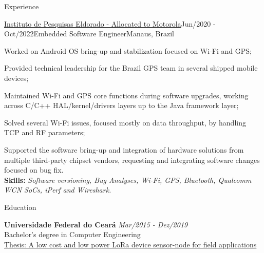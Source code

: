 \documentclass[
	11pt, %
]{resume} %
\begin{document}
\begin{rSection}{Experience}
	\begin{rSubsection}{\href{https://www.eldorado.org.br/en/o-eldorado}{Instituto de Pesquisas Eldorado - Allocated to Motorola}}{Jun/2020 - Oct/2022}{Embedded Software Engineer}{Manaus, Brazil}
	    \item Worked on Android OS bring-up and stabilization focused on Wi-Fi and GPS;
		\item Provided technical leadership for the Brazil GPS team in several shipped mobile devices;
		\item Maintained Wi-Fi and GPS core functions during software upgrades, working across C/C++ HAL/kernel/drivers layers up to the Java framework layer;
		\item Solved several Wi-Fi issues, focused mostly on data throughput, by handling TCP and RF parameters;
		\item Supported the software bring-up and integration of hardware solutions from multiple third-party chipset vendors, requesting and integrating software changes focused on bug fix.
		\vspace{0.2cm}
		\\\textbf{Skills:} \textit{Software versioning, Bug Analyses, Wi-Fi, GPS, Bluetooth, Qualcomm WCN SoCs, iPerf and Wireshark.}
	\end{rSubsection}

\end{rSection}


\begin{rSection}{Education}
	
	
	\textbf{Universidade Federal do Ceará} \hfill {\em Mar/2015 - Dez/2019}
	\\ Bachelor's degree in Computer Engineering
	\\ \href{https://github.com/emanuel36/LoRa-sensor-node-device}{Thesis: A low cost and low power LoRa device sensor-node for field applications \hspace{0.5pt} \faGithub}
	
\end{rSection}
\end{document}
